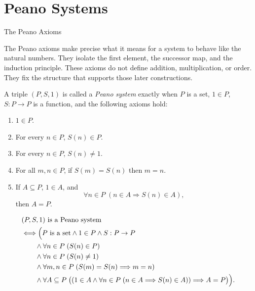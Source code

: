 \section{Peano Systems}

\begin{topicbox}{The Peano Axioms}
\begin{exposition}
The Peano axioms make precise what it means for a system to behave like
the natural numbers. They isolate the first element, the successor map,
and the induction principle. These axioms do not define addition,
multiplication, or order. They fix the structure that supports those
later constructions.
\end{exposition}

\begin{tcolorbox}[colback=defbox, colframe=defborder, arc=2pt,
  left=6pt, right=6pt, top=4pt, bottom=4pt,
  title={\small\textbf{Definition (Peano System)}},
  fonttitle=\small\bfseries]
\begin{definition}
\label{def:peano-system}
A triple $(P,S,1)$ is called a \emph{Peano system} exactly when $P$ is a set,
$1 \in P$, $S : P \to P$ is a function, and the following axioms hold:
\begin{enumerate}
  \item[\textbf{P1.}] $1 \in P$.
  \item[\textbf{P2.}] For every $n \in P$, $S(n) \in P$.
  \item[\textbf{P3.}] For every $n \in P$, $S(n) \neq 1$.
  \item[\textbf{P4.}] For all $m,n \in P$, if $S(m)=S(n)$ then $m=n$.
  \item[\textbf{P5.}] If $A \subseteq P$, $1 \in A$, and
  \[
    \forall n \in P\;(n \in A \Longrightarrow S(n) \in A),
  \]
  then $A=P$.
\end{enumerate}
\end{definition}
\end{tcolorbox}

\begin{remark*}
\[
\begin{aligned}
&(P,S,1) \text{ is a Peano system}\\
&\Longleftrightarrow
\Bigl(P \text{ is a set} \land 1 \in P \land S : P \to P \\
&\qquad \land \forall n \in P\;(S(n) \in P) \\
&\qquad \land \forall n \in P\;(S(n) \neq 1) \\
&\qquad \land \forall m,n \in P\;(S(m)=S(n) \Longrightarrow m=n) \\
&\qquad \land \forall A \subseteq P\;
\bigl((1 \in A \land
\forall n \in P\;(n \in A \Longrightarrow S(n) \in A))
\Longrightarrow A=P\bigr)\Bigr).
\end{aligned}
\]
\end{remark*}


\end{topicbox}
